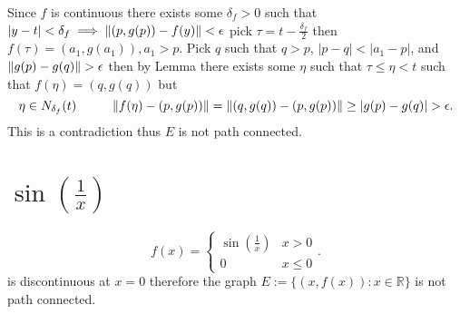 \documentclass[11pt]{article}
\DeclarePairedDelimiter{\norm}{\lVert}{\rVert}
\begin{document}
Since $f$ is continuous there exists some $\delta_f > 0$ such that $|y-t| < \delta_f \implies \norm{(p,g(p)) - f(y)} < \epsilon$ pick  $\tau = t-\frac{\delta_f}{2}$ then $f(\tau) = (a_1,g(a_1)), a_1 > p$. Pick
$q$ such that $q > p$, $|p-q| < |a_1-p|$, and $\norm{g(p) - g(q)} > \epsilon$ then by Lemma there exists some $\eta$ such that $\tau \le \eta < t$ such that  $f(\eta) = (q,g(q))$ but
\[
    \eta \in N_{\delta_f}(t) \hspace{1cm} \norm{f(\eta) - (p,g(p))} = \norm{(q,g(q)) - (p,g(p))} \ge |g(p)-g(q)| > \epsilon
.\] 
This is a contradiction thus $E$ is not path connected.

\section{$\sin(\frac{1}{x})$}
\[
f(x) = 
\begin{cases}
    \sin(\frac{1}{x}) & x > 0\\
    0 & x \le 0
\end{cases}
.\] 
is discontinuous at $x=0$ therefore the graph $E := \{(x,f(x)): x \in \mathbb{R}\}$ is not path connected.
\end{document}
